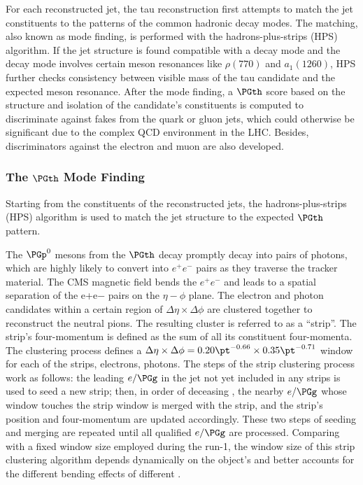 For each reconstructed jet, the tau reconstruction first attempts to match the jet constituents to the patterns of the common hadronic decay modes. The matching, also known as mode finding, is performed with the hadrons-plus-strips (HPS) algorithm. If the jet structure is found compatible with a decay mode and the decay mode involves certain meson resonances like $\rho(770)$ and $a_1(1260)$, HPS further checks consistency between visible mass of the tau candidate and the expected meson resonance. After the mode finding, a $\PGth$ score based on the structure and isolation of the candidate's constituents is computed to discriminate against fakes from the quark or gluon jets, which could otherwise be significant due to the complex QCD environment in the LHC. Besides, discriminators against the electron and muon are also developed.


\subsubsection{The $\PGth$ Mode Finding}

Starting from the constituents of the reconstructed jets, the hadrons-plus-strips (HPS) algorithm is used to match the jet structure to the expected $\PGth$ pattern. 

The $\PGp^0$ mesons from the $\PGth$ decay promptly decay into pairs of photons, which are highly likely to convert into $e^+e^-$ pairs as they traverse the tracker material. The CMS magnetic field bends the $e^+e^-$ and leads to a spatial separation of the e+e− pairs on the $\eta-\phi$ plane. The electron and photon candidates within a certain region of $\Delta\eta \times \Delta \phi$  are clustered together to reconstruct the neutral pions. The resulting cluster is referred to as a “strip”. The strip's four-momentum is defined as the sum of all its constituent four-momenta. The clustering process defines a $\Delta\eta \times \Delta \phi = 0.20\pt^{-0.66} \times 0.35 \pt^{-0.71}$ window for each of the strips, electrons, photons. The steps of the strip clustering process work as follows: the leading $e/\PGg$ in the jet not yet included in any strips is used to seed a new strip; then, in order of deceasing \pt, the nearby $e/\PGg$ whose window touches the strip window is merged with the strip, and the strip's position and four-momentum are updated accordingly. These two steps of seeding and merging are repeated until all qualified $e/\PGg$ are processed. Comparing with a fixed window size employed during the run-1, the window size of this strip clustering algorithm depends dynamically on the object's \pt and better accounts for the different bending effects of different \pt.

